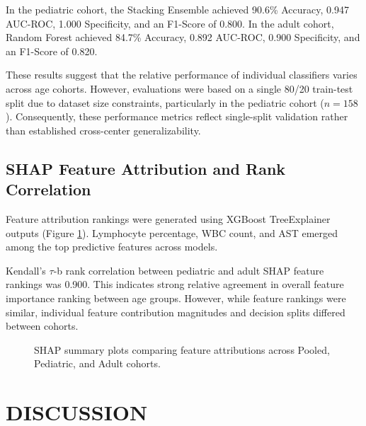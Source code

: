 \documentclass[12pt, a4paper]{report}
\begin{document}
In the pediatric cohort, the Stacking Ensemble achieved 90.6\% Accuracy, 0.947 AUC-ROC, 1.000 Specificity, and an F1-Score of 0.800. In the adult cohort, Random Forest achieved 84.7\% Accuracy, 0.892 AUC-ROC, 0.900 Specificity, and an F1-Score of 0.820.

These results suggest that the relative performance of individual classifiers varies across age cohorts. However, evaluations were based on a single 80/20 train-test split due to dataset size constraints, particularly in the pediatric cohort ($n=158$). Consequently, these performance metrics reflect single-split validation rather than established cross-center generalizability.

\section{SHAP Feature Attribution and Rank Correlation}
Feature attribution rankings were generated using XGBoost TreeExplainer outputs (Figure \ref{fig:shap}). Lymphocyte percentage, WBC count, and AST emerged among the top predictive features across models.

Kendall's $\tau$-b rank correlation between pediatric and adult SHAP feature rankings was 0.900. This indicates strong relative agreement in overall feature importance ranking between age groups. However, while feature rankings were similar, individual feature contribution magnitudes and decision splits differed between cohorts.

\begin{figure}[htbp]
    \centering
    \caption{SHAP summary plots comparing feature attributions across Pooled, Pediatric, and Adult cohorts.}
    \label{fig:shap}
\end{figure}

\chapter{DISCUSSION}
\end{document}

